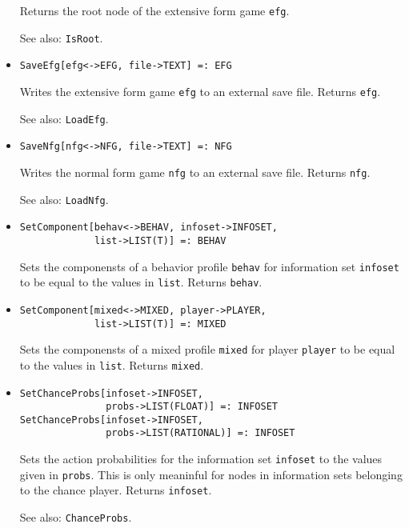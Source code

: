 \begin{itemize}
\bd
Returns the root node of the extensive form game \verb+efg+.
\item
[See also:] {\tt IsRoot}.
\ed


\item
\protect \large \begin{verbatim}
SaveEfg[efg<->EFG, file->TEXT] =: EFG
\end{verbatim}\normalsize

\bd
Writes the extensive form game \verb+efg+ to an external
save file.  Returns \verb+efg+.
\item
[See also:] {\tt LoadEfg}.
\ed

\item
\protect \large \begin{verbatim}
SaveNfg[nfg<->NFG, file->TEXT] =: NFG
\end{verbatim}\normalsize

\bd
Writes the normal form game \verb+nfg+ to an external
save file.  Returns \verb+nfg+.
\item
[See also:] {\tt LoadNfg}.
\ed

\item
\protect \large \begin{verbatim} 
SetComponent[behav<->BEHAV, infoset->INFOSET, 
             list->LIST(T)] =: BEHAV 
\end{verbatim}\normalsize

\bd
Sets the componensts of a behavior profile \verb+behav+ for
information set \verb+infoset+ to be equal to the values in \verb+list+.
Returns \verb+behav+. 
\ed

\item
\protect \large \begin{verbatim} 
SetComponent[mixed<->MIXED, player->PLAYER, 
             list->LIST(T)] =: MIXED 
\end{verbatim}\normalsize

\bd
Sets the componensts of a mixed profile \verb+mixed+ for player
\verb+player+ to be equal to the values in \verb+list+.
Returns \verb+mixed+. 
\ed

\item
\protect \large \begin{verbatim} 
SetChanceProbs[infoset->INFOSET, 
               probs->LIST(FLOAT)] =: INFOSET
SetChanceProbs[infoset->INFOSET, 
               probs->LIST(RATIONAL)] =: INFOSET
\end{verbatim}\normalsize

\bd
Sets the action probabilities for the information set
\verb+infoset+ to the values given in \verb+probs+.  This is only
meaninful for nodes in information sets belonging to the chance
player.  Returns \verb+infoset+. 
\item
[See also:] {\tt ChanceProbs}.
\ed



\end{itemize}
